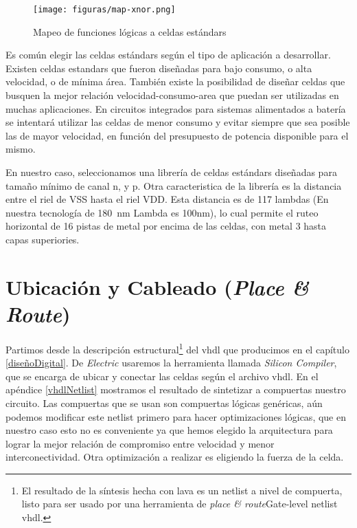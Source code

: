 
\begin{figure}[h]
\centering
\texttt{[image: figuras/map-xnor.png]}
  \caption{Mapeo de funciones lógicas a celdas estándars}
  \label{fig:map-xnor}
\end{figure}

Es común elegir las celdas estándars según el tipo de aplicación a desarrollar. Existen celdas estandars que fueron diseñadas para bajo consumo, o alta velocidad, o de mínima área. También existe la posibilidad de diseñar celdas que busquen la mejor relación velocidad-consumo-area que puedan ser utilizadas en muchas aplicaciones. En circuitos integrados para sistemas alimentados a batería se intentará utilizar las celdas de menor consumo y evitar siempre que sea posible las de mayor velocidad, en función del presupuesto de potencia disponible para el mismo.

En nuestro caso, seleccionamos una librería de celdas estándars diseñadas para tamaño mínimo de canal n, y p. %
Otra caracteristica de la librería es la distancia entre el riel de VSS hasta el riel VDD. Esta distancia es de 117 lambdas (En nuestra tecnología de 180~nm Lambda es 100nm), lo cual permite el ruteo horizontal de 16 pistas de metal por encima de las celdas, con metal 3 hasta capas superiories.

 


\section{Ubicación y Cableado (\emph{Place \& Route})}
Partimos desde la descripción estructural\footnote{El resultado de la síntesis hecha con lava es un netlist a nivel de compuerta, listo para ser usado por una herramienta de \emph{place \& route}Gate-level netlist vhdl.} del vhdl que producimos en el capítulo \ref{diseñoDigital}. De \emph{Electric} usaremos la herramienta llamada \emph{Silicon Compiler}, que se encarga de ubicar y conectar las celdas según el archivo vhdl. En el apéndice \ref{vhdlNetlist} mostramos el resultado de sintetizar a compuertas nuestro circuito. Las compuertas que se usan son compuertas lógicas genéricas, aún podemos modificar este netlist primero para hacer optimizaciones lógicas, que en nuestro caso esto no es conveniente ya que hemos elegido la arquitectura para lograr la mejor relación de compromiso entre velocidad y menor interconectividad. Otra optimización a realizar es eligiendo la fuerza de la celda.



